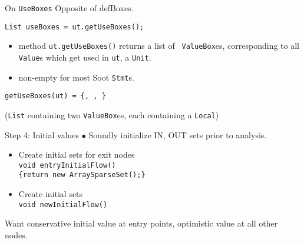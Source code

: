 \begin{slide}{On {\tt UseBoxes}}
\vspace*{-0.1in}
Opposite of defBoxes.

{\tt List useBoxes = ut.getUseBoxes();}

\vspace*{-0.05in}
\begin{itemize}
\item method {\red \tt ut.getUseBoxes()} returns a list of {\tt
ValueBox}es, corresponding to all {\tt Value}s which get used
in {\tt ut}, a {\tt Unit}. 

\item non-empty for most Soot {\tt Stmt}s.
\end{itemize}

\vspace*{-0.08in}
\begin{center}
\end{center}

\vspace*{0.05in}
{\tt getUseBoxes(ut) = \{, , \}}\\
\qquad \qquad \begin{minipage}{0.8\textwidth} 
({\tt List} containing two {\tt ValueBox}es, each containing a {\tt Local})
\end{minipage}

\end{slide}

\begin{slide}{Step 4: Initial values}
\vspace*{-0.15in}
$\bullet$ Soundly initialize IN, OUT sets prior to analysis.

\vspace*{-0.1in}
\begin{itemize}
\item Create initial sets for exit nodes\\
{\tt void entryInitialFlow() \\ 
\qquad \{return new ArraySparseSet();\} }

\item Create initial sets\\
{\tt void newInitialFlow()}\\

\end{itemize}

Want conservative initial value at entry points, optimistic
value at all other nodes.
\end{slide}

